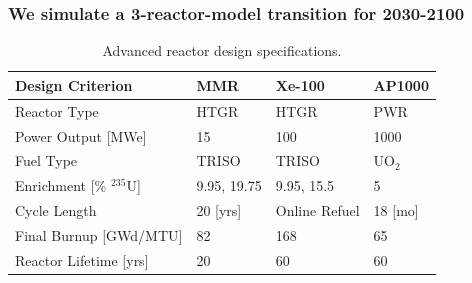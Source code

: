 \documentclass[9pt]{beamer}
\newcommand{\cyclus}{\textsc{Cyclus}\xspace}
\begin{document}
  \begin{frame}
    \frametitle{We simulate a 3-reactor-model transition for 2030-2100}
    \begin{table}[H]
      \centering
      \caption{Advanced reactor design specifications.}
      \label{tab:ar_defs}
      \begin{tabular}{l l l l}
         \hline
         \textbf{Design Criterion} & \textbf{MMR} \cite{usnc_design_2021} & \textbf{Xe-100} \cite{nuscale_chapter_2018} & \textbf{AP1000} \\
         \hline
         Reactor Type & HTGR & HTGR & PWR \\
         Power Output [MWe] & 15 & 100 & 1000 \\
         Fuel Type & TRISO & TRISO & UO$_2$ \\
         Enrichment [\% $^{235}$U] & 9.95, 19.75 & 9.95, 15.5 & 5 \\
         Cycle Length & 20 [yrs] & Online Refuel & 18 [mo] \\
         Final Burnup [GWd/MTU] & 82 & 168 & 65 \\
         Reactor Lifetime [yrs] & 20 & 60 & 60 \\
         \hline
      \end{tabular}
   \end{table}
  \end{frame}

\end{document}
